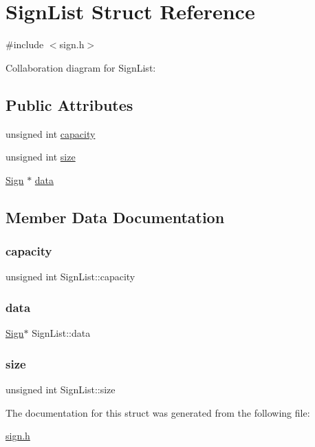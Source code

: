 \hypertarget{structSignList}{}\section{Sign\+List Struct Reference}
\label{structSignList}


{\ttfamily \#include $<$sign.\+h$>$}



Collaboration diagram for Sign\+List\+:
\subsection*{Public Attributes}
\begin{DoxyCompactItemize}
\item 
unsigned int \hyperlink{structSignList_a56d04de93571aa77cff50c4ee30f8682}{capacity}
\item 
unsigned int \hyperlink{structSignList_a1a62d68f9161254e618060ab4ffe2d89}{size}
\item 
\hyperlink{structSign}{Sign} $\ast$ \hyperlink{structSignList_aee3357bed55f987188d91160a631ae64}{data}
\end{DoxyCompactItemize}


\subsection{Member Data Documentation}
\mbox{\label{structSignList_a56d04de93571aa77cff50c4ee30f8682}} 
\subsubsection{\texorpdfstring{capacity}{capacity}}
{\footnotesize\ttfamily unsigned int Sign\+List\+::capacity}

\mbox{\label{structSignList_aee3357bed55f987188d91160a631ae64}} 
\subsubsection{\texorpdfstring{data}{data}}
{\footnotesize\ttfamily \hyperlink{structSign}{Sign}$\ast$ Sign\+List\+::data}

\mbox{\label{structSignList_a1a62d68f9161254e618060ab4ffe2d89}} 
\subsubsection{\texorpdfstring{size}{size}}
{\footnotesize\ttfamily unsigned int Sign\+List\+::size}



The documentation for this struct was generated from the following file\+:\begin{DoxyCompactItemize}
\item 
\hyperlink{sign_8h}{sign.\+h}\end{DoxyCompactItemize}
